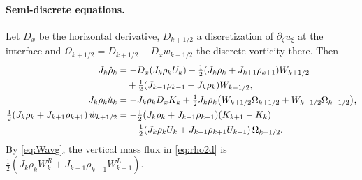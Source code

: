 \documentclass[11pt,a4paper]{article}
\begin{document}
\paragraph{Semi-discrete equations.}
Let $D_x$ be the horizontal derivative, $D_{k+1/2}$ a discretization of
$\partial_\zeta u_\xi$ at the interface and
$\Omega_{k+1/2} = D_{k+1/2} - D_x w_{k+1/2}$ the discrete vorticity there.
Then
\begin{align}
  J_k\dot\rho_k &= -D_x(J_k\rho_kU_k)
    - \tfrac12(J_k\rho_k + J_{k+1}\rho_{k+1})W_{k+1/2}\notag\\
    &\quad + \tfrac12(J_{k-1}\rho_{k-1} + J_k\rho_k)W_{k-1/2},
    \label{eq:rho2d}\\
  J_k\rho_k\dot u_k &= -J_k\rho_k D_xK_k
    + \tfrac12 J_k\rho_k\bigl(W_{k+1/2}\Omega_{k+1/2}
    + W_{k-1/2}\Omega_{k-1/2}\bigr),
    \label{eq:u2d}\\
  \tfrac12(J_k\rho_k + J_{k+1}\rho_{k+1})\,\dot w_{k+1/2} &=
    -\tfrac12(J_k\rho_k + J_{k+1}\rho_{k+1})(K_{k+1} - K_k)\notag\\
    &\quad - \tfrac12(J_k\rho_kU_k + J_{k+1}\rho_{k+1}U_{k+1})\,\Omega_{k+1/2}.
    \label{eq:w2d}
\end{align}
By \eqref{eq:Wavg}, the vertical mass flux in \eqref{eq:rho2d} is
$\tfrac12(J_k\rho_kW^R_k + J_{k+1}\rho_{k+1}W^L_{k+1})$.
\end{document}
